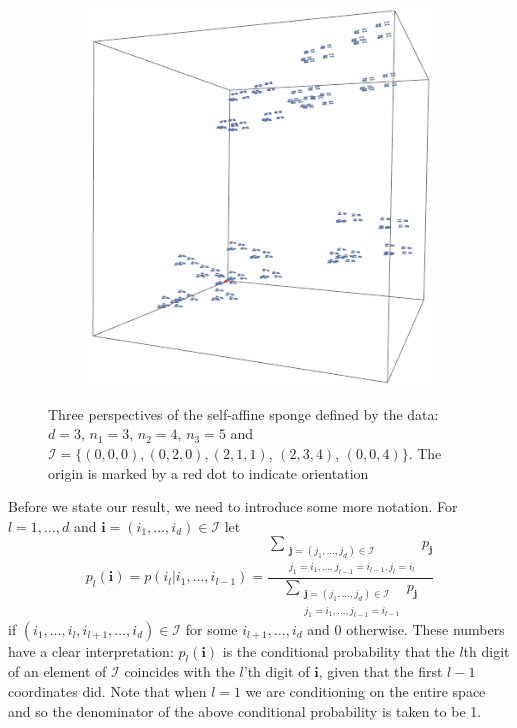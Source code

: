 \begin{figure}[h]
	\begin{subfigure}{0.35\textwidth}
		\centering
		\includegraphics[width=0.85\linewidth]{pics/ch-upper-reg/sponge13.png}
		\label{ch-upper-reg:fig:sub2}
	\end{subfigure}
	\caption{Three perspectives of the self-affine sponge defined by the data: $d=3$,  $n_1=3$, $n_2=4$, $n_3=5$ and $\mathcal{I} = \{ (0,0,0),(0,2,0),(2,1,1)$, $(2,3,4)$, $(0,0,4) \}$. The origin is marked by a red dot to indicate orientation}
\end{figure}


Before we state our result, we need to introduce some more notation.  For $l=1, \dots, d$ and $\textbf{i}=(i_1, \ldots, i_d)\in \mathcal{I} $  let 
\[
p_l(\mathbf{i})=p (i_l \vert i_1, \ldots , i_{l-1})=\frac{\displaystyle\sum_{\substack{\textbf{j}=\left( j_1, \ldots, j_d\right)\in \mathcal{I} \\ j_1=i_1, \ldots, j_{l-1}=i_{l-1}, j_l=i_l}}p_{\textbf{j}}}{\displaystyle\sum_{\substack{\textbf{j}=\left( j_1, \ldots, j_d\right)\in \mathcal{I} \\ j_1=i_1, \ldots, j_{l-1}=i_{l-1}}}p_{\textbf{j}}}
\]
if $(i_1, \ldots, i_l, i_{l+1},\ldots, i_d) \in \mathcal{I}$ for some $i_{l+1},\ldots, i_d$ and $0$ otherwise.  These numbers have a clear interpretation: $p_l(\mathbf{i})$ is the conditional probability that the $l$th digit of an element of $\mathcal{I}$  coincides with the $l$'th digit of $\mathbf{i}$, given that the first $l-1$ coordinates did.  Note that when $l=1$ we are conditioning on the entire space and so the denominator of the above conditional probability is taken to be 1.

